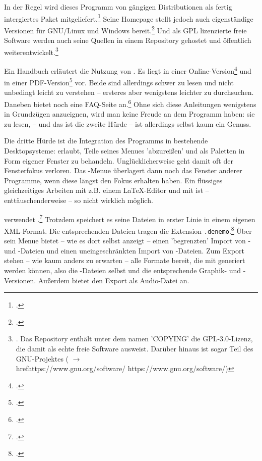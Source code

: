 In der Regel wird dieses Programm von gängigen Distributionen als fertig
intergiertes Paket mitgeliefert.\footcite[vgl. z.B.][\nopage
wp]{UbuntuDenemo2014a} Seine Homepage stellt jedoch auch eigenständige
Versionen für GNU/Linux und Windows bereit.\footcite[vgl.][\nopage
wp]{Denemo2019d} Und als GPL lizenzierte freie Software werden auch seine
Quellen in einem Repository gehostet und öffentlich
weiterentwickelt.\footnote{\cite[vgl.][\nopage wp]{GithubDenemo2019a}.
Das Repository enthält unter dem namen 'COPYING' die GPL-3.0-Lizenz, die
 damit als echte freie Software ausweist. Darüber hinaus ist
 sogar Teil des GNU-Projektes ( $\rightarrow$
\\href{https://www.gnu.org/software/} {https://www.gnu.org/software/})}

Ein Handbuch erläutert die Nutzung von . Es liegt in einer
Online-Version\footcite[vgl.][\nopage wp]{Shann2015a} und in einer
PDF-Version\footcite[vgl.][2ff]{Shann2015b} vor. Beide sind allerdings schwer zu
lesen und nicht unbedingt leicht zu verstehen -- ersteres aber wenigstens leichter
zu durchsuchen. Daneben bietet  noch eine FAQ-Seite
an.\footcite[vgl.][\nopage wp]{Denemo2019c} Ohne sich diese Anleitungen
wenigstens in Grundzügen anzueignen, wird man keine Freude an dem Programm
haben: sie zu lesen, -- und das ist die zweite Hürde -- ist allerdings selbst
kaum ein Genuss.

Die dritte Hürde ist die Integration des Programms in bestehende Desktopsysteme:
 erlaubt, Teile seines Menues 'abzureißen' und als Paletten in Form
eigener Fenster zu behandeln. Unglücklicherweise geht damit oft der Fensterfokus
verloren. Das -Menue überlagert dann noch das Fenster anderer
Programme, wenn diese längst den Fokus erhalten haben. Ein flüssiges
gleichzeitiges Arbeiten mit z.B. einem \LaTeX-Editor und mit  ist
-- enttäuschenderweise -- so nicht wirklich möglich.

 verwendet .\footcite[vgl.][\nopage
wp]{Denemo2019b} Trotzdem speichert es seine Dateien in erster Linie in einem
eigenen XML-Format. Die entsprechenden Dateien tragen die Extension
\texttt{.denemo}.\footcite[vgl. dazu][\nopage wp]{WpedDenemo2018a} Über sein
Menue bietet  -- wie es dort selbst anzeigt -- einen 'begrenzten'
Import von - und -Dateien und einen uneingeschränkten
Import von -Dateien. Zum Export stehen -- wie kaum anders zu
erwarten -- alle Formate bereit, die mit  generiert werden können,
also die -Dateien selbst und die entsprechende Graphik- und
-Versionen. Außerdem bietet  den Export als Audio-Datei an.

